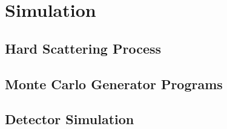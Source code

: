 \chapter{Simulation}

\section{Hard Scattering Process}
\section{Monte Carlo Generator Programs}
\section{Detector Simulation}


